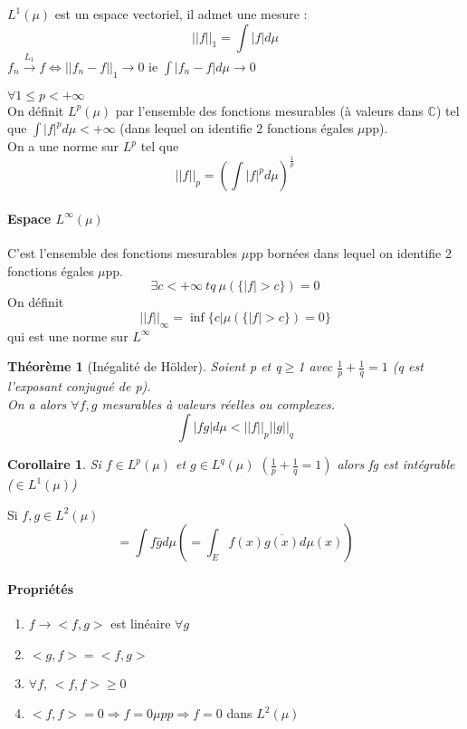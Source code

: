 \documentclass{article}
\theoremstyle{mes_theoremes}
\newtheorem{coro}{Corollaire}[section]
\newtheorem{theo}{Théorème}[section]
\begin{document}
$L^1(\mu)$ est un espace vectoriel, il admet une mesure : \[||f||_1=\int |f| d\mu\]
$f_n \xrightarrow{L_1} f \Leftrightarrow ||f_n-f||_1 \rightarrow 0$ ie $\int |f_n-f| d\mu \rightarrow 0$ 

$\forall 1\leq p < +\infty$ \\
On définit $L^p(\mu)$ par l'ensemble des fonctions mesurables (à valeurs dans $\mathbb{C}$) tel que $\int |f|^p d\mu <+\infty$ (dans lequel on identifie 2 fonctions égales $\mu$pp).\\
On a une norme sur $L^p$ tel que \[||f||_p = \left(\int |f|^p d\mu \right)^{\frac{1}{p}}\]

\paragraph{Espace $L^{\infty}(\mu)$ \\}
C'est l'ensemble des fonctions mesurables $\mu$pp bornées dans lequel on identifie 2 fonctions égales $\mu$pp. \[\exists c<+\infty\ tq\ \mu(\{|f|>c\})=0\]
On définit \[||f||_{\infty}=\inf \{c|\mu(\{|f|>c\})=0\}\]
qui est une norme sur $L^{\infty}$ \\

\begin{theo}[Inégalité de Hölder]
Soient p et q$\geq$1 avec $\frac{1}{p} + \frac{1}{q}=1$ (q est l'exposant conjugué de p). \\
On a alors $\forall f,g$ mesurables à valeurs réelles ou complexes. \[\int |fg| d\mu < ||f||_p ||g||_q\]
\end{theo}

\begin{coro}
Si $f\in L^p(\mu)$ et $g\in L^q(\mu)$ $\left(\frac{1}{p} + \frac{1}{q}=1\right)$ alors fg est intégrable ($\in L^1(\mu)$)
\end{coro}

\bigskip
Si $f,g\in L^2(\mu)$ \[<f,g>=\int f\bar{g} d\mu \left(=\int_E f(x)\overline{g(x)} d\mu(x) \right)\]

\paragraph{Propriétés}
\begin{enumerate}
\item $f\rightarrow <f,g>$ est linéaire $\forall g$
\item $<g,f>=<f,g>$
\item $\forall f$, $<f,f>\geq 0$
\item $<f,f>=0 \Rightarrow f=0 \mu pp \Rightarrow f=0$ dans $L^2(\mu)$
\end{enumerate}
\end{document}
